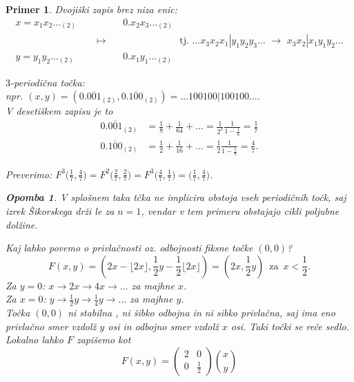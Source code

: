 \documentclass{article}
\newtheorem{opomba}{Opomba}
\newtheorem{primer}{Primer}
\begin{document}
\begin{primer}
Dvojiški zapis brez niza enic:
\begin{align*}
x = x_1 x_2 \dots_{(2)} \quad&\quad\quad\quad 0.x_2 x_3 \dots_{(2)} \\[-2mm]
&\longmapsto \quad\quad\quad\quad\quad\quad\quad \text{ tj. } \dots x_3x_2x_1 | y_1 y_2 y_3 \dots \,\,\longrightarrow\,\, x_3 x_2| x_1 y_1 y_2\dots \\[-2mm]
y = y_1 y_2 \dots_{(2)} \quad&\quad\quad\quad 0.x_1 y_1 \dots_{(2)}
\end{align*}

\noindent
$3$-periodična točka:\\[1mm]
npr. $(x, y) = (0. \overline{001}_{(2)}, 0. \overline{100}_{(2)}) = \dots 100100|100100 \dots$.\\
V desetiškem zapisu je to 
\begin{align*}
0.\overline{001}_{(2)} &= \frac{1}{8} + \frac{1}{64} + \dots = \frac{1}{2^3} \frac{1}{1 - \frac{1}{8}} = \frac{1}{7} \\
0.\overline{100}_{(2)} &= \frac{1}{2} + \frac{1}{16} + \dots = \frac{1}{2} \frac{1}{1 - \frac{1}{8}} = \frac{4}{7}.
\end{align*}

Preverimo: $F^3\Big(\frac{1}{7}, \frac{4}{7}\Big) = F^2\Big(\frac{2}{7}, \frac{2}{7}\Big) = F^3\Big(\frac{4}{7}, \frac{1}{7}\Big) = \Big(\frac{1}{7}, \frac{4}{7}\Big)$.

\begin{opomba}
    V splošnem taka tčka ne implicira obstoja vseh periodičnih točk, saj 
    izrek Šikorskega drži le za $n=1$, vendar v tem primeru obstajajo cikli 
    poljubne dolžine.
\end{opomba}
   
Kaj lahko povemo o privlačnosti oz. odbojnosti fiksne točke $(0, 0)$?
$$
F(x, y) = (2x - \lfloor 2x \rfloor, \frac{1}{2}y - \frac{1}{2}\lfloor 2x \rfloor) = (2x, \frac{1}{2} y) \,\text{ za }\, x < \frac{1}{2}.
$$
Za $y=0$: $x \rightarrow 2x \rightarrow 4x \rightarrow \dots$ za majhne $x$.\\
Za $x=0$: $y \rightarrow \frac{1}{2} y \rightarrow \frac{1}{4} y \rightarrow \dots$ za majhne $y$.\\[1mm]
Točka $(0, 0)$ ni stabilna , ni šibko odbojna in ni sibko privlačna, saj ima eno 
privlačno smer vzdolž $y$ osi in odbojno smer vzdolž $x$ osi. Taki 
točki se reče sedlo.\\
\noindent
Lokalno lahko $F$ zapišemo kot 
$$ F(x, y)=\left(\begin{array}{ll}
    2 & 0 \\
    0 & \frac{1}{2}
    \end{array}\right)\binom{x}{y}$$
\end{primer}
\end{document}
